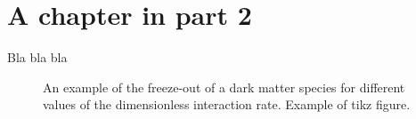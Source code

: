 \chapter{A chapter in part 2}
\label{chap:chap2}
Bla bla bla
\begin{figure}
    \centering
    
    \caption{An example of the freeze-out of a dark matter species for different values of the dimensionless interaction rate. Example of tikz figure.}
    \label{fig:boltzmann_freeze}
\end{figure}